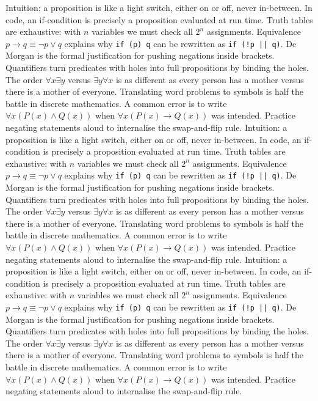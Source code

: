 Intuition: a proposition is like a light switch, either on or off, never in-between.
In code, an if-condition is precisely a proposition evaluated at run time.
Truth tables are exhaustive: with $n$ variables we must check all $2^n$ assignments.
Equivalence $p\to q\equiv\neg p\lor q$ explains why \texttt{if (p) q} can be rewritten as \texttt{if (!p || q)}.
De Morgan is the formal justification for pushing negations inside brackets.
Quantifiers turn predicates with holes into full propositions by binding the holes.
The order $\forall x\exists y$ versus $\exists y\forall x$ is as different as every person has a mother versus there is a mother of everyone.
Translating word problems to symbols is half the battle in discrete mathematics.
A common error is to write $\forall x(P(x)\land Q(x))$ when $\forall x(P(x)\to Q(x))$ was intended.
Practice negating statements aloud to internalise the swap-and-flip rule.
Intuition: a proposition is like a light switch, either on or off, never in-between.
In code, an if-condition is precisely a proposition evaluated at run time.
Truth tables are exhaustive: with $n$ variables we must check all $2^n$ assignments.
Equivalence $p\to q\equiv\neg p\lor q$ explains why \texttt{if (p) q} can be rewritten as \texttt{if (!p || q)}.
De Morgan is the formal justification for pushing negations inside brackets.
Quantifiers turn predicates with holes into full propositions by binding the holes.
The order $\forall x\exists y$ versus $\exists y\forall x$ is as different as every person has a mother versus there is a mother of everyone.
Translating word problems to symbols is half the battle in discrete mathematics.
A common error is to write $\forall x(P(x)\land Q(x))$ when $\forall x(P(x)\to Q(x))$ was intended.
Practice negating statements aloud to internalise the swap-and-flip rule.
Intuition: a proposition is like a light switch, either on or off, never in-between.
In code, an if-condition is precisely a proposition evaluated at run time.
Truth tables are exhaustive: with $n$ variables we must check all $2^n$ assignments.
Equivalence $p\to q\equiv\neg p\lor q$ explains why \texttt{if (p) q} can be rewritten as \texttt{if (!p || q)}.
De Morgan is the formal justification for pushing negations inside brackets.
Quantifiers turn predicates with holes into full propositions by binding the holes.
The order $\forall x\exists y$ versus $\exists y\forall x$ is as different as every person has a mother versus there is a mother of everyone.
Translating word problems to symbols is half the battle in discrete mathematics.
A common error is to write $\forall x(P(x)\land Q(x))$ when $\forall x(P(x)\to Q(x))$ was intended.
Practice negating statements aloud to internalise the swap-and-flip rule.

